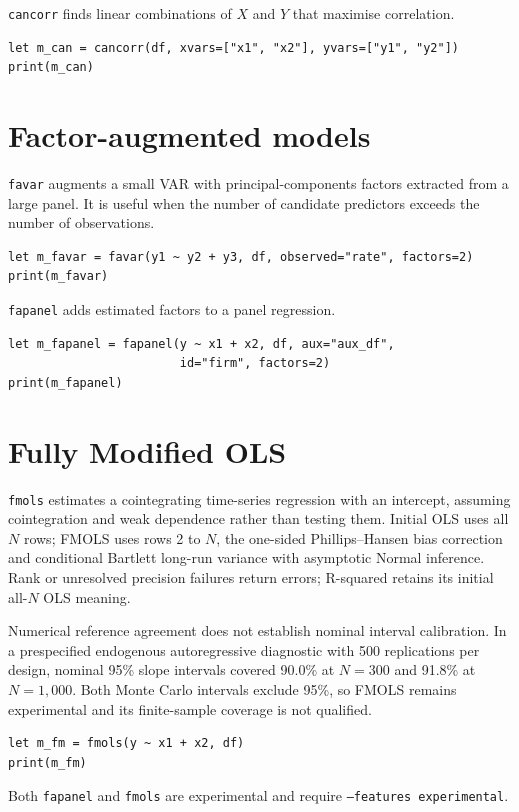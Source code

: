 \texttt{cancorr} finds linear combinations of $X$ and $Y$ that maximise
correlation.

\begin{lstlisting}[caption={Canonical correlation}]
let m_can = cancorr(df, xvars=["x1", "x2"], yvars=["y1", "y2"])
print(m_can)
\end{lstlisting}

\section{Factor-augmented models}

\texttt{favar} augments a small VAR with principal-components factors extracted
from a large panel. It is useful when the number of candidate predictors
exceeds the number of observations.

\begin{lstlisting}[caption={Factor-augmented VAR}]
let m_favar = favar(y1 ~ y2 + y3, df, observed="rate", factors=2)
print(m_favar)
\end{lstlisting}

\texttt{fapanel} adds estimated factors to a panel regression.

\begin{lstlisting}[caption={Factor-augmented panel}]
let m_fapanel = fapanel(y ~ x1 + x2, df, aux="aux_df",
                        id="firm", factors=2)
print(m_fapanel)
\end{lstlisting}

\section{Fully Modified OLS}

\texttt{fmols} estimates a cointegrating time-series regression with an
intercept, assuming cointegration and weak dependence rather than testing them.
Initial OLS uses all $N$ rows; FMOLS uses rows 2 to $N$, the one-sided
Phillips--Hansen bias correction and conditional Bartlett long-run variance
with asymptotic Normal inference. Rank or unresolved precision failures return
errors; R-squared retains its initial all-$N$ OLS meaning.

Numerical reference agreement does not establish nominal interval calibration.
In a prespecified endogenous autoregressive diagnostic with 500 replications per
design, nominal 95\% slope intervals covered 90.0\% at $N=300$ and 91.8\% at
$N=1{,}000$. Both Monte Carlo intervals exclude 95\%, so FMOLS remains
experimental and its finite-sample coverage is not qualified.

\begin{lstlisting}[caption={FM-OLS}]
let m_fm = fmols(y ~ x1 + x2, df)
print(m_fm)
\end{lstlisting}

Both \texttt{fapanel} and \texttt{fmols} are experimental and require
\texttt{--features experimental}.
